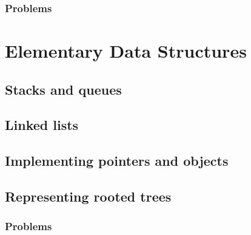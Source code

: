 \documentclass[fontsize=12pt,paper=a4,open=any]{book}
\begin{document}
\subsection*{Problems}


\chapter{Elementary Data Structures}

\section{Stacks and queues}

\section{Linked lists}

\section{Implementing pointers and objects}

\section{Representing rooted trees}

\subsection*{Problems}
\end{document}
